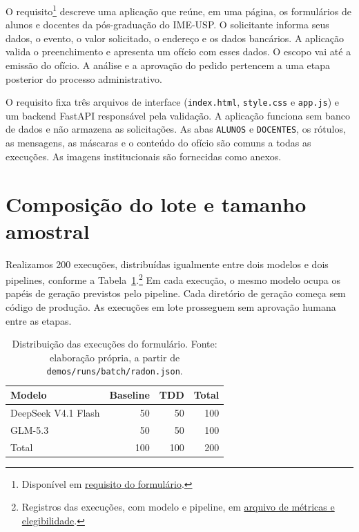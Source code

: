 \documentclass[a4paper,12pt,twoside,english,brazilian]{book}
\begin{document}
O requisito\footnote{Disponível em
\href{https://github.com/Educg550/tcc/blob/ee6d001c1f618419c6184644d18aa97bb33bcf9a/demos/requisitos/01-formulario-docentes-deepseek/requisito.md}{requisito do formulário}.}
descreve uma aplicação que reúne, em uma página, os formulários de
alunos e docentes da pós-graduação do IME-USP. O solicitante informa seus
dados, o evento, o valor solicitado, o endereço e os dados bancários.
A aplicação valida o preenchimento e apresenta um ofício com esses dados.
O escopo vai
até a emissão do ofício. A análise e a aprovação do pedido pertencem a uma
etapa posterior do processo administrativo.

O requisito fixa três arquivos de interface (\texttt{index.html},
\texttt{style.css} e \texttt{app.js}) e um backend FastAPI responsável pela
validação. A aplicação funciona sem banco de dados e não armazena as
solicitações. As abas \texttt{ALUNOS} e \texttt{DOCENTES}, os rótulos, as
mensagens, as máscaras e o conteúdo do ofício são comuns a todas as execuções.
As imagens institucionais são fornecidas como anexos.

\section{Composição do lote e tamanho amostral}
\label{sec:formulario-amostra}

Realizamos 200 execuções, distribuídas igualmente entre dois modelos e
dois pipelines, conforme a Tabela~\ref{tab:formulario-lote}.\footnote{Registros das execuções, com modelo e pipeline, em \href{https://github.com/Educg550/tcc/blob/ee6d001c1f618419c6184644d18aa97bb33bcf9a/demos/runs/batch/radon.json}{arquivo de métricas e elegibilidade}.}
Em cada execução, o mesmo modelo ocupa os papéis de geração previstos pelo pipeline. Cada
diretório de geração começa sem código de produção. As execuções em lote
prosseguem sem aprovação humana entre as etapas.

\begin{table}[htp]
  \centering
  \caption{Distribuição das execuções do formulário. Fonte: elaboração
    própria, a partir de \texttt{demos/runs/batch/radon.json}.}
  \label{tab:formulario-lote}
  \begin{tabular}{lrrr}
    \hline
    Modelo & Baseline & TDD & Total \\
    \hline
    DeepSeek V4.1 Flash & 50 & 50 & 100 \\
    GLM-5.3 & 50 & 50 & 100 \\
    \hline
    Total & 100 & 100 & 200 \\
    \hline
  \end{tabular}
\end{table}
\end{document}
